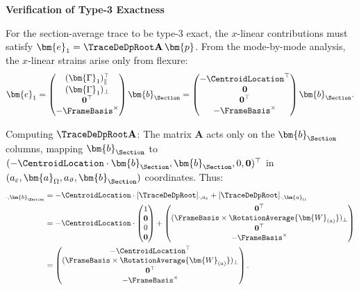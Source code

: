 \begin{Details}
\textbf{Verification of Type-3 Exactness}

For the section-average trace to be type-3 exact, the $x$-linear contributions 
must satisfy $\bm{e}_1 = \TraceDeDpRoot\mathbf{A}\,\bm{p}$. 
From the mode-by-mode analysis, the $x$-linear strains arise only from flexure:
\begin{equation*}
\bm{e}_1 = \begin{pmatrix}
(\bm{\Gamma}_1)_\parallel^\top \\
(\bm{\Gamma}_1)_\perp \\
\mathbf{0}^\top \\
-\FrameBasis^\times
\end{pmatrix} \bm{b}_{\Section}
= \begin{pmatrix}
-\CentroidLocation^\top \\
\mathbf{0} \\
\mathbf{0}^\top \\
-\FrameBasis^\times
\end{pmatrix} \bm{b}_{\Section}.
\end{equation*}

Computing $\TraceDeDpRoot\mathbf{A}$: The matrix $\mathbf{A}$ acts only on the 
$\bm{b}_{\Section}$ columns, mapping $\bm{b}_{\Section}$ to 
$(-\CentroidLocation \cdot \bm{b}_{\Section}, \bm{b}_{\Section}, 0, \mathbf{0})^\top$ 
in $(a_\varepsilon, \bm{a}_\Omega, a_\vartheta, \bm{b}_{\Section})$ coordinates. Thus:
\begin{align*}
[\TraceDeDpRoot\mathbf{A}]_{\cdot, \bm{b}_{\Section}} 
&= -\CentroidLocation \cdot [\TraceDeDpRoot]_{\cdot, a_\varepsilon} 
+ [\TraceDeDpRoot]_{\cdot, \bm{a}_\Omega} \\
&= -\CentroidLocation \cdot \begin{pmatrix} 1 \\ \mathbf{0} \\ 0 \\ \mathbf{0} \end{pmatrix}
+ \begin{pmatrix} \mathbf{0}^\top \\ (\FrameBasis \times \RotationAverage{\bm{W}_{(a)}})_\perp \\ \mathbf{0}^\top \\ -\FrameBasis^\times \end{pmatrix} \\
&= \begin{pmatrix} -\CentroidLocation^\top \\ (\FrameBasis \times \RotationAverage{\bm{W}_{(a)}})_\perp \\ \mathbf{0}^\top \\ -\FrameBasis^\times \end{pmatrix}.
\end{align*}


\end{Details}
